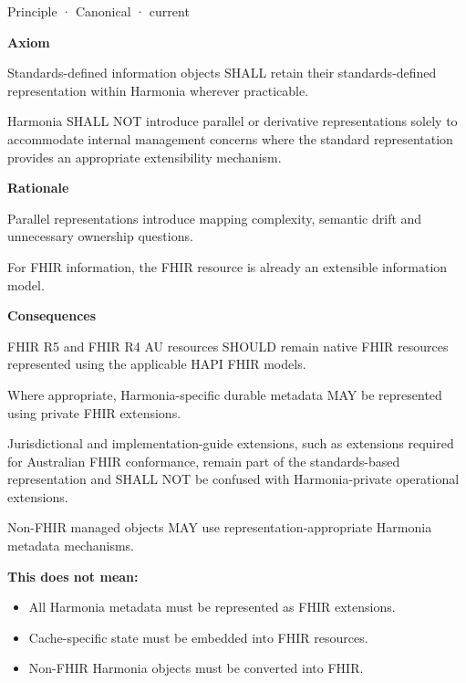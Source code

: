 \label{element:e99a4e2bf99f476d876394300d6b9c3d}
{\small Principle · Canonical · current}\par

\par\medskip\textbf{Axiom}\par


Standards-defined information objects SHALL retain their
standards-defined representation within Harmonia wherever practicable.



Harmonia SHALL NOT introduce parallel or derivative representations
solely to accommodate internal management concerns where the standard
representation provides an appropriate extensibility mechanism.



\par\medskip\textbf{Rationale}\par


Parallel representations introduce mapping complexity, semantic drift
and unnecessary ownership questions.



For FHIR information, the FHIR resource is already an extensible
information model.



\par\medskip\textbf{Consequences}\par


FHIR R5 and FHIR R4 AU resources SHOULD remain native FHIR resources
represented using the applicable HAPI FHIR models.



Where appropriate, Harmonia-specific durable metadata MAY be represented
using private FHIR extensions.



Jurisdictional and implementation-guide extensions, such as extensions
required for Australian FHIR conformance, remain part of the
standards-based representation and SHALL NOT be confused with
Harmonia-private operational extensions.



Non-FHIR managed objects MAY use representation-appropriate Harmonia
metadata mechanisms.



\textbf{This does not mean:}



\begin{itemize}


\item All Harmonia metadata must be represented as FHIR extensions.

\item Cache-specific state must be embedded into FHIR resources.

\item Non-FHIR Harmonia objects must be converted into FHIR.

\end{itemize}

